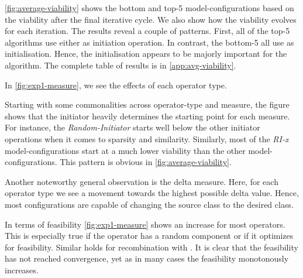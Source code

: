 \documentclass[./../../paper.tex]{subfiles}
\begin{document}
\autoref{fig:average-viability} shows the bottom and top-5 model-configurations based on the viability after the final iterative cycle. We also show how the viability evolves for each iteration. The results reveal a couple of patterns. 
First, all of the top-5 algorithms use either  as initiation operation. In contrast, the bottom-5 all use  as initialisation. Hence, the initialisation appears to be majorly important for the algorithm.
The complete table of results is in \autoref{app:avg-viability}.




In \autoref{fig:exp1-measure}, we see the effects of each operator type. 

Starting with some commonalities across operator-type and measure, the figure shows that the initiator heavily determines the starting point for each measure. For instance, the \emph{Random-Initiator} starts well below the other initiator operations when it comes to sparsity and similarity. Similarly, most of the \emph{RI-x} model-configurations start at a much lower viability than the other model-configurations. This pattern is obvious in \autoref{fig:average-viability}. 

Another noteworthy general observation is the delta measure. Here, for each operator type we see a movement towards the highest possible delta value. Hence, most configurations are capable of changing the source class to the desired class. 

In terms of feasibility \autoref{fig:exp1-measure} shows an increase for most operators. This is especially true if the operator has a random component or if it optimizes for feasibility. Similar holds for recombination with . It is clear that the feasibility has not reached convergence, yet as in many cases the feasibility monotonously increases.  
\end{document}
